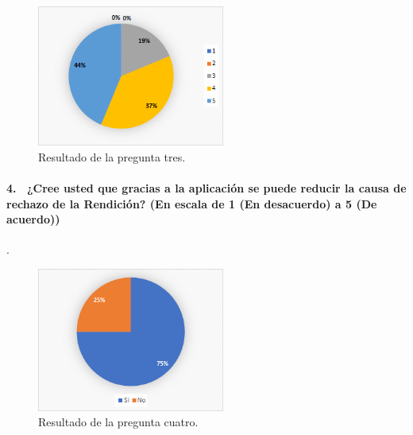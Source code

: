 \begin{figure}[h!]
    \centering
    \includegraphics[width=0.55\textwidth]{Imagenes/Pregunta3.png}
    \caption{\label{fig: Pregunta3}Resultado de la pregunta tres.}
\end{figure}

\paragraph{4.  ¿Cree usted que gracias a la aplicación se puede reducir la causa de rechazo de la Rendición? (En escala de 1 (En desacuerdo) a 5 (De acuerdo))}.

\begin{figure}[h!]
    \centering
    \includegraphics[width=0.55\textwidth]{Imagenes/Pregunta4.png}
    \caption{\label{fig: Pregunta4}Resultado de la pregunta cuatro.}
\end{figure}
